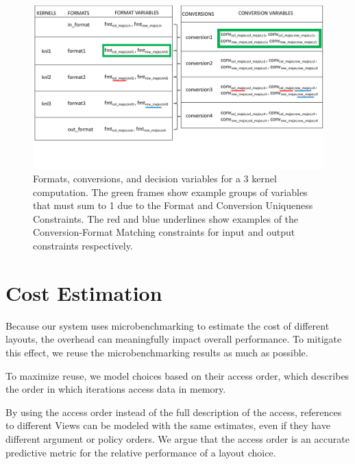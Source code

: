 \documentclass[sigconf]{acmart}
\begin{document}
\begin{figure}
	\includegraphics[width=2\columnwidth]{FormatConversionFigure.pdf}
	\caption{Formats, conversions, and decision variables for a 3 kernel computation. The green frames show example groups of variables that must sum to 1 due to the Format and Conversion Uniqueness Constraints. The red and blue underlines show examples of the Conversion-Format Matching constraints for input and output constraints respectively. }
	\label{ConstraintExample}
\end{figure}
\section{Cost Estimation}

Because our system uses microbenchmarking to estimate the cost of different layouts, the overhead can meaningfully impact overall performance. 
To mitigate this effect, we reuse the microbenchmarking results as much as possible.
 
To maximize reuse, we model choices based on their access order, which describes the order in which iterations access data in memory.

By using the access order instead of the full description of the access, references to different Views can be modeled with the same estimates, even if they have different argument or policy orders.
We argue that the access order is an accurate predictive metric for the relative performance of a layout choice. 
\end{document}
